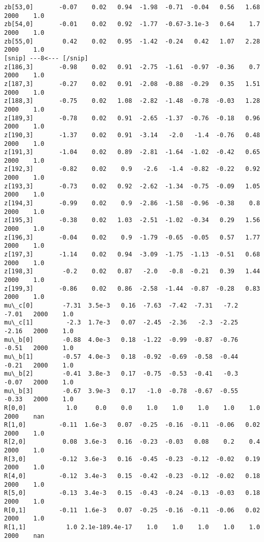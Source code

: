 \documentclass[11pt]{article}
\begin{document}
\begin{Verbatim}[commandchars=\\\{\}]
zb[53,0]       -0.07    0.02   0.94  -1.98  -0.71  -0.04   0.56   1.68   2000    1.0
zb[54,0]       -0.01    0.02   0.92  -1.77  -0.67-3.1e-3   0.64    1.7   2000    1.0
zb[55,0]        0.42    0.02   0.95  -1.42  -0.24   0.42   1.07   2.28   2000    1.0
[snip] ---8<--- [/snip]
z[186,3]       -0.98    0.02   0.91  -2.75  -1.61  -0.97  -0.36    0.7   2000    1.0
z[187,3]       -0.27    0.02   0.91  -2.08  -0.88  -0.29   0.35   1.51   2000    1.0
z[188,3]       -0.75    0.02   1.08  -2.82  -1.48  -0.78  -0.03   1.28   2000    1.0
z[189,3]       -0.78    0.02   0.91  -2.65  -1.37  -0.76  -0.18   0.96   2000    1.0
z[190,3]       -1.37    0.02   0.91  -3.14   -2.0   -1.4  -0.76   0.48   2000    1.0
z[191,3]       -1.04    0.02   0.89  -2.81  -1.64  -1.02  -0.42   0.65   2000    1.0
z[192,3]       -0.82    0.02    0.9   -2.6   -1.4  -0.82  -0.22   0.92   2000    1.0
z[193,3]       -0.73    0.02   0.92  -2.62  -1.34  -0.75  -0.09   1.05   2000    1.0
z[194,3]       -0.99    0.02    0.9  -2.86  -1.58  -0.96  -0.38    0.8   2000    1.0
z[195,3]       -0.38    0.02   1.03  -2.51  -1.02  -0.34   0.29   1.56   2000    1.0
z[196,3]       -0.04    0.02    0.9  -1.79  -0.65  -0.05   0.57   1.77   2000    1.0
z[197,3]       -1.14    0.02   0.94  -3.09  -1.75  -1.13  -0.51   0.68   2000    1.0
z[198,3]        -0.2    0.02   0.87   -2.0   -0.8  -0.21   0.39   1.44   2000    1.0
z[199,3]       -0.86    0.02   0.86  -2.58  -1.44  -0.87  -0.28   0.83   2000    1.0
mu\_c[0]        -7.31  3.5e-3   0.16  -7.63  -7.42  -7.31   -7.2  -7.01   2000    1.0
mu\_c[1]         -2.3  1.7e-3   0.07  -2.45  -2.36   -2.3  -2.25  -2.16   2000    1.0
mu\_b[0]        -0.88  4.0e-3   0.18  -1.22  -0.99  -0.87  -0.76  -0.51   2000    1.0
mu\_b[1]        -0.57  4.0e-3   0.18  -0.92  -0.69  -0.58  -0.44  -0.21   2000    1.0
mu\_b[2]        -0.41  3.8e-3   0.17  -0.75  -0.53  -0.41   -0.3  -0.07   2000    1.0
mu\_b[3]        -0.67  3.9e-3   0.17   -1.0  -0.78  -0.67  -0.55  -0.33   2000    1.0
R[0,0]           1.0     0.0    0.0    1.0    1.0    1.0    1.0    1.0   2000    nan
R[1,0]         -0.11  1.6e-3   0.07  -0.25  -0.16  -0.11  -0.06   0.02   2000    1.0
R[2,0]          0.08  3.6e-3   0.16  -0.23  -0.03   0.08    0.2    0.4   2000    1.0
R[3,0]         -0.12  3.6e-3   0.16  -0.45  -0.23  -0.12  -0.02   0.19   2000    1.0
R[4,0]         -0.12  3.4e-3   0.15  -0.42  -0.23  -0.12  -0.02   0.18   2000    1.0
R[5,0]         -0.13  3.4e-3   0.15  -0.43  -0.24  -0.13  -0.03   0.18   2000    1.0
R[0,1]         -0.11  1.6e-3   0.07  -0.25  -0.16  -0.11  -0.06   0.02   2000    1.0
R[1,1]           1.0 2.1e-189.4e-17    1.0    1.0    1.0    1.0    1.0   2000    nan

\end{Verbatim}
\end{document}
